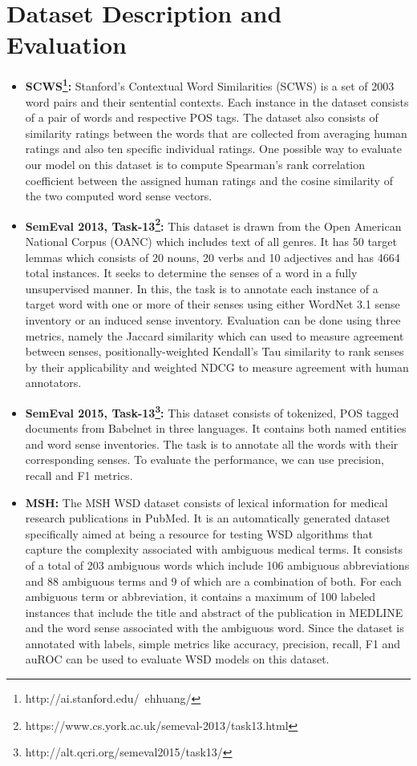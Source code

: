 \documentclass{article}
\begin{document}
\section{Dataset Description and Evaluation}
\begin{itemize}
\item \textbf{SCWS\footnote{http://ai.stanford.edu/~ehhuang/}:} Stanford’s Contextual Word Similarities (SCWS) is a set of 2003 word pairs and their sentential contexts. Each instance in the dataset consists of a pair of words and respective POS tags. The dataset also consists of similarity ratings between the words that are collected from averaging human ratings and also ten specific individual ratings. One possible way to evaluate our model on this dataset is to compute Spearman’s rank correlation coefficient between the assigned human ratings and the cosine similarity of the two computed word sense vectors.

\item \textbf{SemEval 2013, Task-13\footnote{https://www.cs.york.ac.uk/semeval-2013/task13.html}:} This dataset is drawn from the Open American National Corpus (OANC) which includes text of all genres. It has 50 target lemmas which consists of 20 nouns, 20 verbs and 10 adjectives and has 4664 total instances. It seeks to determine the senses of a word in a fully unsupervised manner. In this, the task is to annotate each instance of a target word with one or more of their senses using either WordNet 3.1 sense inventory or an induced sense inventory. Evaluation can be done using three metrics, namely the Jaccard similarity which can used to measure agreement between senses, positionally-weighted Kendall’s Tau similarity to rank senses by their applicability and weighted NDCG to measure agreement with human annotators.

\item \textbf{SemEval 2015, Task-13\footnote{http://alt.qcri.org/semeval2015/task13/}:} This dataset consists of tokenized, POS tagged documents from Babelnet in three languages. It contains both named entities and word sense inventories. The task is to annotate all the words with their corresponding senses. To evaluate the performance, we can use precision, recall and F1 metrics.

\item \textbf{MSH:} The MSH WSD dataset consists of lexical information for medical research publications in PubMed. It is an automatically generated dataset specifically aimed at being a resource for testing WSD algorithms that capture the complexity associated with ambiguous medical terms. It consists of a total of 203 ambiguous words which include 106 ambiguous abbreviations and 88 ambiguous terms and 9 of which are a combination of both. For each ambiguous term or abbreviation, it contains a maximum of 100 labeled instances that include the title and abstract of the publication in MEDLINE and the word sense associated with the ambiguous word. Since the dataset is annotated with labels, simple metrics like accuracy, precision, recall, F1 and auROC can be used to evaluate WSD models on this dataset.
\end{itemize}
\end{document}
